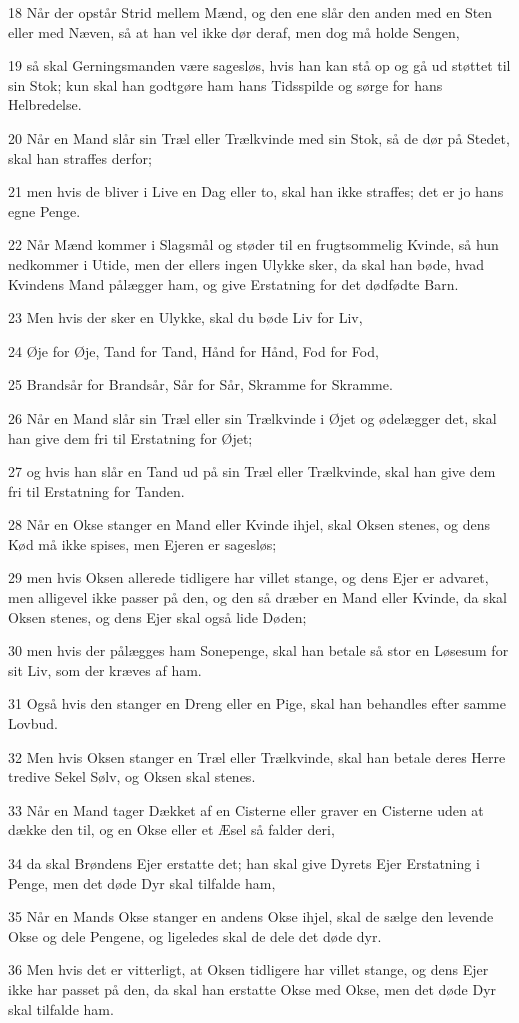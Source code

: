\par 18 Når der opstår Strid mellem Mænd, og den ene slår den anden med en Sten eller med Næven, så at han vel ikke dør deraf, men dog må holde Sengen,
\par 19 så skal Gerningsmanden være sagesløs, hvis han kan stå op og gå ud støttet til sin Stok; kun skal han godtgøre ham hans Tidsspilde og sørge for hans Helbredelse.
\par 20 Når en Mand slår sin Træl eller Trælkvinde med sin Stok, så de dør på Stedet, skal han straffes derfor;
\par 21 men hvis de bliver i Live en Dag eller to, skal han ikke straffes; det er jo hans egne Penge.
\par 22 Når Mænd kommer i Slagsmål og støder til en frugtsommelig Kvinde, så hun nedkommer i Utide, men der ellers ingen Ulykke sker, da skal han bøde, hvad Kvindens Mand pålægger ham, og give Erstatning for det dødfødte Barn.
\par 23 Men hvis der sker en Ulykke, skal du bøde Liv for Liv,
\par 24 Øje for Øje, Tand for Tand, Hånd for Hånd, Fod for Fod,
\par 25 Brandsår for Brandsår, Sår for Sår, Skramme for Skramme.
\par 26 Når en Mand slår sin Træl eller sin Trælkvinde i Øjet og ødelægger det, skal han give dem fri til Erstatning for Øjet;
\par 27 og hvis han slår en Tand ud på sin Træl eller Trælkvinde, skal han give dem fri til Erstatning for Tanden.
\par 28 Når en Okse stanger en Mand eller Kvinde ihjel, skal Oksen stenes, og dens Kød må ikke spises, men Ejeren er sagesløs;
\par 29 men hvis Oksen allerede tidligere har villet stange, og dens Ejer er advaret, men alligevel ikke passer på den, og den så dræber en Mand eller Kvinde, da skal Oksen stenes, og dens Ejer skal også lide Døden;
\par 30 men hvis der pålægges ham Sonepenge, skal han betale så stor en Løsesum for sit Liv, som der kræves af ham.
\par 31 Også hvis den stanger en Dreng eller en Pige, skal han behandles efter samme Lovbud.
\par 32 Men hvis Oksen stanger en Træl eller Trælkvinde, skal han betale deres Herre tredive Sekel Sølv, og Oksen skal stenes.
\par 33 Når en Mand tager Dækket af en Cisterne eller graver en Cisterne uden at dække den til, og en Okse eller et Æsel så falder deri,
\par 34 da skal Brøndens Ejer erstatte det; han skal give Dyrets Ejer Erstatning i Penge, men det døde Dyr skal tilfalde ham,
\par 35 Når en Mands Okse stanger en andens Okse ihjel, skal de sælge den levende Okse og dele Pengene, og ligeledes skal de dele det døde dyr.
\par 36 Men hvis det er vitterligt, at Oksen tidligere har villet stange, og dens Ejer ikke har passet på den, da skal han erstatte Okse med Okse, men det døde Dyr skal tilfalde ham.


